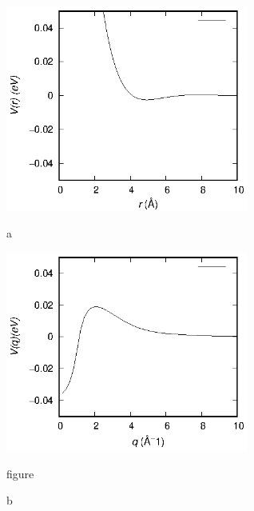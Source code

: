 \documentclass[final,12pt]{elsarticle}
\begin{document}
{\begin{adjustbox}{center,label={somelabel},vspace=\bigskipamount}
	\includegraphics[width=0.6\textwidth]{vCsBRET.eps}
	\caption[short]{a}
	\includegraphics[width=0.6\textwidth]{vCsFFACT.eps}
	\caption{figure}{b}
\end{adjustbox}

}
\end{document}
